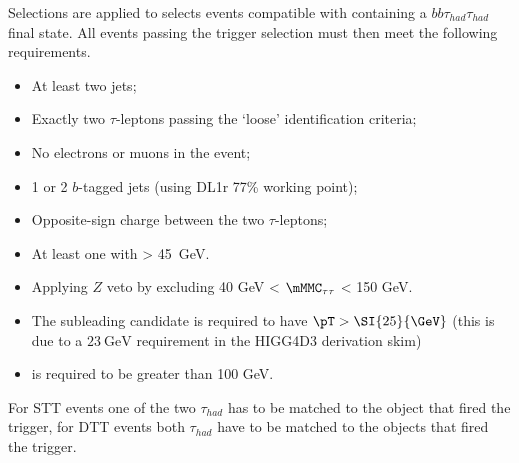 
Selections are applied to selects events compatible with containing a $bb\tau_{had}\tau_{had}$ final state.
All events passing the trigger selection must then meet the following requirements.

\begin{itemize}
\item At least two jets;
\item Exactly two $\tau$-leptons passing the `loose' identification criteria;
\item No electrons or muons in the event;
\item 1 or 2 $b$-tagged jets (using DL1r 77\% working point);
\item Opposite-sign charge between the two $\tau$-leptons;
\item At least one \bjet with \pT > \SI{45}{\GeV}. %
\item Applying $Z$ veto by excluding 40 GeV < $\mMMC_{\tau\tau}$ < 150 GeV.
\item The subleading \tauhad candidate is required to have $\pT > \SI{25}{\GeV}$
  (this is due to a $\SI{23}{\GeV}$ requirement in the HIGG4D3 derivation skim)
\item \MET is required to be greater than 100 GeV.
\end{itemize}

For STT events one of the two $\tau_{had}$ has to be matched to the object that fired the trigger, for DTT events both $\tau_{had}$ have to be matched to the objects that fired the trigger.

